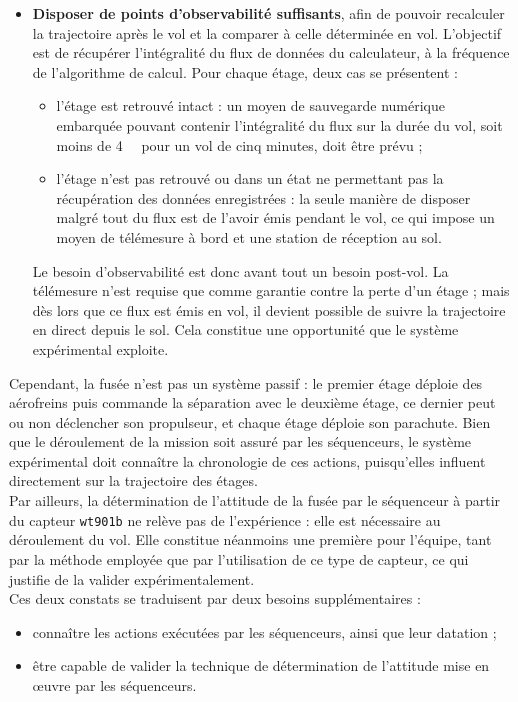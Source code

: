 \begin{itemize}
    \item \textbf{Disposer de points d'observabilité suffisants}, afin de pouvoir recalculer la trajectoire après le vol et
    la comparer à celle déterminée en vol. L'objectif est de récupérer l'intégralité du flux de données du calculateur, à la
    fréquence de l'algorithme de calcul. Pour chaque étage, deux cas se présentent :
    \begin{itemize}
        \item l'étage est retrouvé intact : un moyen de sauvegarde numérique embarquée pouvant contenir l'intégralité du flux sur
        la durée du vol, soit moins de \SI{4}{\mega\byte} pour un vol de cinq minutes, doit être prévu ;
        \item l'étage n'est pas retrouvé ou dans un état ne permettant pas la récupération des données enregistrées : la seule
        manière de disposer malgré tout du flux est de l'avoir émis pendant le vol, ce qui impose un moyen de télémesure à bord et
        une station de réception au sol.
    \end{itemize}
    Le besoin d'observabilité est donc avant tout un besoin post-vol. La télémesure n'est requise que comme garantie contre la
    perte d'un étage ; mais dès lors que ce flux est émis en vol, il devient possible de suivre la trajectoire en direct depuis
    le sol. Cela constitue une opportunité que le système expérimental exploite.\\
\end{itemize}

Cependant, la fusée n'est pas un système passif : le premier étage déploie des aérofreins puis commande la séparation avec le
deuxième étage, ce dernier peut ou non déclencher son propulseur, et chaque étage déploie son parachute. Bien que le déroulement
de la mission soit assuré par les séquenceurs, le système expérimental doit connaître la chronologie de ces actions, puisqu'elles
influent directement sur la trajectoire des étages.\\

Par ailleurs, la détermination de l'attitude de la fusée par le séquenceur à partir du capteur \verb|wt901b| ne relève pas de
l'expérience : elle est nécessaire au déroulement du vol. Elle constitue néanmoins une première pour l'équipe, tant par la méthode
employée que par l'utilisation de ce type de capteur, ce qui justifie de la valider expérimentalement.\\

Ces deux constats se traduisent par deux besoins supplémentaires :
\begin{itemize}
    \item connaître les actions exécutées par les séquenceurs, ainsi que leur datation ;
    \item être capable de valider la technique de détermination de l'attitude mise en œuvre par les séquenceurs.\\
\end{itemize}

